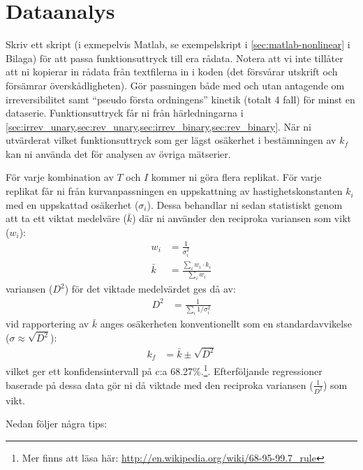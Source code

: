 \section{Dataanalys}
\label{sec:analys}
Skriv ett skript (i exmepelvis Matlab, se exempelskript i
\cref{sec:matlab-nonlinear} i Bilaga) för att passa funktionsuttryck till
era rådata. Notera att vi inte tillåter att ni kopierar in rådata från
textfilerna in i koden (det försvårar utskrift och försämrar
överskådligheten). Gör passningen både med och utan antagende om
irreversibilitet samt ``pseudo första ordningens'' kinetik (totalt 4
fall) för minst en dataserie. Funktionsuttryck får ni från härledningarna
i \cref{sec:irrev_unary,sec:rev_unary,sec:irrev_binary,sec:rev_binary}.
När ni utvärderat vilket funktionsuttryck som ger lägst osäkerhet i
bestämningen av $k_f$ kan ni använda det för analysen av övriga
mätserier.

För varje kombination av $T$ och $I$ kommer ni göra flera replikat. För
varje replikat får ni från kurvanpassningen en uppskattning av
hastighetskonstanten $k_i$ med en uppskattad osäkerhet
($\sigma_i$). Dessa behandlar ni sedan statistiskt genom att ta ett
viktat medelväre ($\bar{k}$) där ni använder den reciproka variansen som
vikt ($w_i$):
\begin{align}
  w_i &= \frac{1}{\sigma_i^2} \\
  \bar{k} &= \frac{\sum_i{w_i \cdot k_i}}{\sum_i{w_i}}
\end{align}
variansen ($D^2$) för det viktade medelvärdet ges då av:
\begin{align}
  D^2 &= \frac{1}{\sum_i 1/\sigma_i^2}
\end{align}
vid rapportering av $\bar{k}$ anges osäkerheten konventionellt som en
standardavvikelse ($\sigma \approx \sqrt{D^2}$):
\begin{align}
  k_f &= \bar{k} \pm \sqrt{D^2}
\end{align}
vilket ger ett konfidensintervall på c:a 68.27\%.\footnote{
Mer finns att läsa här:
\url{http://en.wikipedia.org/wiki/68-95-99.7\_rule}
}. Efterföljande regressioner baserade på dessa
data gör ni då viktade med den reciproka variansen ($\frac{1}{D^2}$) som
vikt.

Nedan följer några tips:

